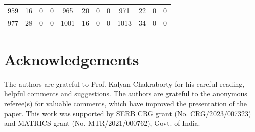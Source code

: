 \documentclass[12pt, 14paper,reqno]{amsart}
\theoremstyle{plain}
\theoremstyle{proof}
\numberwithin{equation}{section}
\begin{document}
\begin{center}
\begin{longtable}{cccc|cccc|cccc}
959& 16& 0 &0& 965& 20& 0& 0&971& 22& 0 &0\\
977& 28& 0& 0& 1001& 16& 0& 0&1013& 34& 0& 0
 \end{longtable}
\end{center}

\section*{Acknowledgements}
The authors are grateful to Prof. Kalyan Chakraborty for his careful reading, helpful comments and suggestions.  The authors are grateful to the anonymous referee(s) for valuable comments, which have improved the presentation of the paper. This work was supported by SERB CRG grant (No. CRG/2023/007323) and MATRICS grant (No. MTR/2021/000762), Govt. of India.

 
\end{document}
